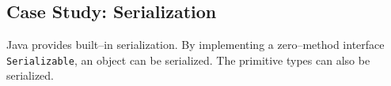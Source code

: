 %
%
%
%
%
%
%
%
%

\subsection{Case Study: Serialization}
	Java provides built--in serialization\cite{957325,944589,376846}.  By implementing a zero--method interface \texttt{Serializable}, an object can be serialized.  The primitive types can also be serialized.

